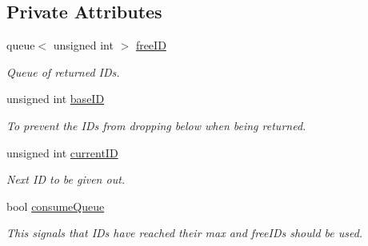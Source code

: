 \subsection*{\-Private \-Attributes}
\begin{DoxyCompactItemize}
\item 
\hypertarget{classcIDManager_a0bed8666fa886f86428e7ac059bc5de0}{queue$<$ unsigned int $>$ \hyperlink{classcIDManager_a0bed8666fa886f86428e7ac059bc5de0}{free\-I\-D}}\label{de/dd4/classcIDManager_a0bed8666fa886f86428e7ac059bc5de0}

\begin{DoxyCompactList}\small\item\em \-Queue of returned \-I\-Ds. \end{DoxyCompactList}\item 
\hypertarget{classcIDManager_a40438d3df4bce74a0344f21517479066}{unsigned int \hyperlink{classcIDManager_a40438d3df4bce74a0344f21517479066}{base\-I\-D}}\label{de/dd4/classcIDManager_a40438d3df4bce74a0344f21517479066}

\begin{DoxyCompactList}\small\item\em \-To prevent the \-I\-Ds from dropping below when being returned. \end{DoxyCompactList}\item 
\hypertarget{classcIDManager_a951329fb713c227a88b8db71e0f09e9c}{unsigned int \hyperlink{classcIDManager_a951329fb713c227a88b8db71e0f09e9c}{current\-I\-D}}\label{de/dd4/classcIDManager_a951329fb713c227a88b8db71e0f09e9c}

\begin{DoxyCompactList}\small\item\em \-Next \-I\-D to be given out. \end{DoxyCompactList}\item 
\hypertarget{classcIDManager_a8e7c466b5b71bf46a203d3c92533daa0}{bool \hyperlink{classcIDManager_a8e7c466b5b71bf46a203d3c92533daa0}{consume\-Queue}}\label{de/dd4/classcIDManager_a8e7c466b5b71bf46a203d3c92533daa0}

\begin{DoxyCompactList}\small\item\em \-This signals that \-I\-Ds have reached their max and free\-I\-Ds should be used. \end{DoxyCompactList}\end{DoxyCompactItemize}


